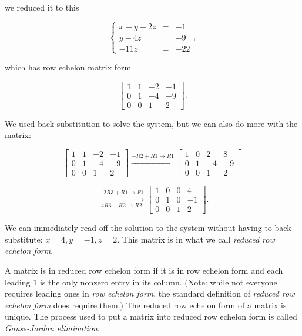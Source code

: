\documentclass[
]{book}
\theoremstyle{definition}
\theoremstyle{definition}
\theoremstyle{definition}
\theoremstyle{definition}
\theoremstyle{remark}
\begin{document}
we reduced it to this

\begin{equation*}
    \left\{
    \begin{array}{rcl}
    x+y-2z&=&-1\\
    y-4z&=&-9\\ 
    -11z&=&-22
    \end{array} \right. ,
\end{equation*}

which has row echelon matrix form

\[\left[\begin{array}{rrr|r}
1 & 1 & -2 & -1\\
0 & 1 & -4 & -9\\
0 & 0 & 1 & 2
\end{array}\right].\]

We used back substitution to solve the system, but we can also do more with the matrix:

\[\left[\begin{array}{rrr|r}
1 & 1 & -2 & -1\\
0 & 1 & -4 & -9\\
0 & 0 & 1 & 2
\end{array}\right]
\xrightarrow{-R2+R1\to R1}
\left[\begin{array}{rrr|r}
1 & 0 & 2 & 8\\
0 & 1 & -4 & -9\\
0 & 0 & 1 & 2
\end{array}\right]\]

\[\xrightarrow[4R3+R2\to R2]{-2R3+R1\to R1}
\left[\begin{array}{rrr|r}
1 & 0 & 0 & 4\\
0 & 1 & 0 & -1\\
0 & 0 & 1 & 2
\end{array}\right].
\]

We can immediately read off the solution to the system without having to back substitute: \(x=4,y=-1,z=2\). This matrix is in what we call \emph{reduced row echelon form}.

A matrix is in reduced row echelon form if it is in row echelon form and each leading 1 is the only nonzero entry in its column. (Note: while not everyone requires leading ones in \emph{row echelon form}, the standard definition of \emph{reduced row echelon form} does require them.) The reduced row echelon form of a matrix is unique. The process used to put a matrix into reduced row echelon form is called \emph{Gauss-Jordan elimination}.
\end{document}
